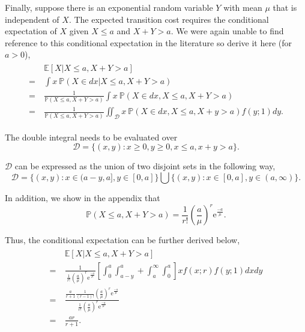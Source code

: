 Finally, suppose there is an exponential random variable $Y$ with mean $\mu$ that is independent of $X$. The expected transition cost requires the conditional expectation of $X$ given $X \leq a$ and $X + Y > a$. We were again unable to find reference to this conditional expectation in the literature so derive it here (for $a > 0$),
\begin{align}
	\begin{split}
		& \ \mathbb{E} [X | X \leq a, X + Y > a] \\
		= & \ \int x \ \mathbb{P} (X \in d x | X \leq a, X + Y > a) \\
		= & \ \frac{1}{\mathbb{P} (X \leq a, X + Y > a)} \int x \ \mathbb{P} (X \in d x, X \leq a, X + Y > a) \\
		= & \ \frac{1}{\mathbb{P} (X \leq a, X + Y > a)} \iint_{\mathcal{D}} x \ \mathbb{P} (X \in d x, X \leq a, X + y > a) f (y; 1) d y.
	\end{split}
\end{align}

The double integral needs to be evaluated over
\begin{equation}
	\mathcal{D} = \Big\{ (x, y) : x \geq 0, y \geq 0, x \leq a, x + y > a \Big\}.
\end{equation}

$\mathcal{D}$ can be expressed as the union of two disjoint sets in the following way,
\begin{equation}
	\mathcal{D} = \Big\{ (x, y) : x \in (a - y, a], y \in [0, a] \Big\} \bigcup \Big\{ (x, y) : x \in [0, a], y \in (a, \infty) \Big\}.
\end{equation}

In addition, we show in the appendix that
\begin{equation}
	\mathbb{P} (X \leq a, X + Y > a) = \frac{1}{r!} \left( \frac{a}{\mu} \right)^{r} \mathrm{e}^{\frac{-a}{\mu}}.
\end{equation}

Thus, the conditional expectation can be further derived below,
\begin{align}
	\begin{split}
		& \ \mathbb{E} [X | X \leq a, X + Y > a] \\
		= & \ \frac{1}{\ \frac{1}{r!} \left( \frac{a}{\mu} \right)^{r} \mathrm{e}^{\frac{-a}{\mu}}} \left[ \int_{0}^{a} \int_{a - y}^{a} + \int_{a}^{\infty} \int_{0}^{a} \right] x f (x; r) f (y; 1) d x d y \\
		= & \ \frac{\frac{a}{r + 1} \frac{1}{(r - 1)!} \left( \frac{a}{\mu} \right)^{r} \mathrm{e}^{\frac{-a}{\mu}}}{\frac{1}{r!} \left( \frac{a}{\mu} \right)^{r} \mathrm{e}^{\frac{-a}{\mu}}} \\
		= & \ \frac{a r}{r + 1}.
	\end{split}
\end{align}

